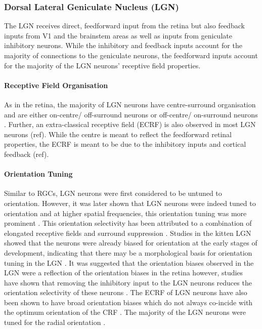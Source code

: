 \subsubsection{Dorsal Lateral Geniculate Nucleus (LGN)}

The LGN receives direct, feedforward input from the retina but also feedback inputs from V1 and the brainstem areas as well as inputs from geniculate inhibitory neurons. While the inhibitory and feedback inputs account for the majority of connections to the geniculate neurons, the feedforward inputs account for the majority of the LGN neurons' receptive field properties. 

\paragraph{Receptive Field Organisation}
As in the retina, the majority of LGN neurons have centre-surround organisation and are either on-centre/ off-surround neurons or off-centre/ on-surround neurons \cite{Hubel1961}. Further, an extra-classical receptive field (ECRF) is also observed in most LGN neurons (ref). While the centre is meant to reflect the feedforward retinal properties, the ECRF is meant to be due to the inhibitory inputs and cortical feedback (ref).


\paragraph{Orientation Tuning}
Similar to RGCs, LGN neurons were first considered to be untuned to orientation. However, it was later shown that LGN neurons were indeed tuned to orientation \cite{Xu2002} and at higher spatial frequencies, this orientation tuning was more prominent \cite{Vidyasagar1982, Vidyasagar1984b, Xu2002, Suematsu2012}. This orientation selectivity has been attributed to a combination of elongated receptive fields and surround suppression \cite{Suematsu2012, Naito2013}.  Studies  in the kitten LGN showed that the neurons were already biased for orientation at the early stages of development, indicating that there may be a morphological basis for orientation tuning in the LGN \cite{Albus1983}. It was suggested that the orientation biases observed in the LGN were a reflection of the orientation biases in the retina \cite{Soodak1987} however, studies have shown that removing the inhibitory input to the LGN neurons reduces the orientation selectivity of these neurons \cite{Vidyasagar1984}. The ECRF of LGN neurons have also been shown to have broad orientation biases which do not always co-incide with the optimum orientation of the CRF \cite{Sun2004,Naito2007}. The majority of the LGN neurons were tuned for the radial orientation \cite{Shou1989, Smith1990b}.

